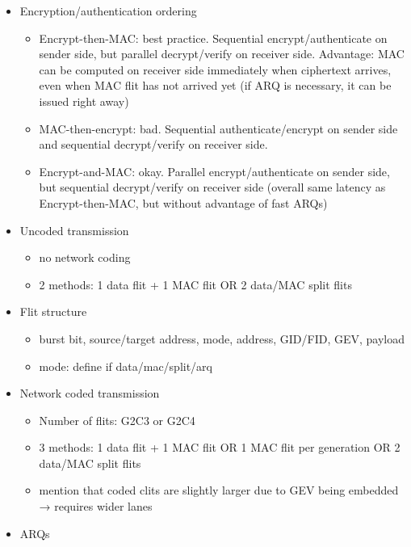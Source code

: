 \begin{itemize}
    \item Encryption/authentication ordering
        \begin{itemize}
            \item Encrypt-then-MAC: best practice. Sequential encrypt/authenticate on sender side, but parallel decrypt/verify
                on receiver side. Advantage: MAC can be computed on receiver side immediately when ciphertext arrives, even when
                MAC flit has not arrived yet (if ARQ is necessary, it can be issued right away)
            \item MAC-then-encrypt: bad. Sequential authenticate/encrypt on sender side and sequential decrypt/verify on receiver
                side.
            \item Encrypt-and-MAC: okay. Parallel encrypt/authenticate on sender side, but sequential decrypt/verify on receiver
                side (overall same latency as Encrypt-then-MAC, but without advantage of fast ARQs)
        \end{itemize}
    \item Uncoded transmission
        \begin{itemize}
            \item no network coding
            \item 2 methods: 1 data flit + 1 MAC flit OR 2 data/MAC split flits
        \end{itemize}
    \item Flit structure
        \begin{itemize}
            \item burst bit, source/target address, mode, address, GID/FID, GEV, payload
            \item mode: define if data/mac/split/arq
        \end{itemize}
    \item Network coded transmission
        \begin{itemize}
            \item Number of flits: G2C3 or G2C4
            \item 3 methods: 1 data flit + 1 MAC flit OR 1 MAC flit per generation OR 2 data/MAC split flits
            \item mention that coded clits are slightly larger due to GEV being embedded → requires wider lanes
        \end{itemize}
    \item ARQs
        \begin{itemize}

\end{itemize}
\end{itemize}
